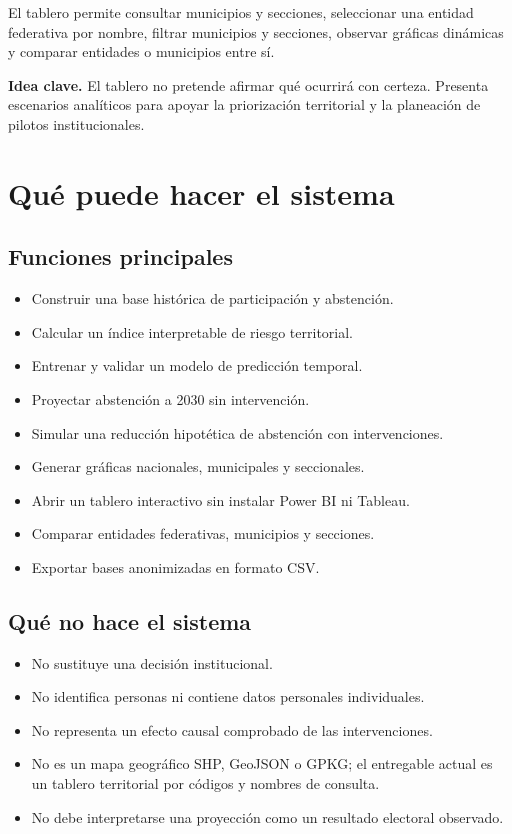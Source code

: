 \documentclass[11pt,a4paper]{article}
\begin{document}
El tablero permite consultar municipios y secciones, seleccionar una entidad federativa por nombre, filtrar municipios y secciones, observar gráficas dinámicas y comparar entidades o municipios entre sí.

\begin{resultado}
\textbf{Idea clave.} El tablero no pretende afirmar qué ocurrirá con certeza. Presenta escenarios analíticos para apoyar la priorización territorial y la planeación de pilotos institucionales.
\end{resultado}

\section{Qué puede hacer el sistema}

\subsection{Funciones principales}

\begin{itemize}
    \item Construir una base histórica de participación y abstención.
    \item Calcular un índice interpretable de riesgo territorial.
    \item Entrenar y validar un modelo de predicción temporal.
    \item Proyectar abstención a 2030 sin intervención.
    \item Simular una reducción hipotética de abstención con intervenciones.
    \item Generar gráficas nacionales, municipales y seccionales.
    \item Abrir un tablero interactivo sin instalar Power BI ni Tableau.
    \item Comparar entidades federativas, municipios y secciones.
    \item Exportar bases anonimizadas en formato CSV.
\end{itemize}

\subsection{Qué no hace el sistema}

\begin{itemize}
    \item No sustituye una decisión institucional.
    \item No identifica personas ni contiene datos personales individuales.
    \item No representa un efecto causal comprobado de las intervenciones.
    \item No es un mapa geográfico SHP, GeoJSON o GPKG; el entregable actual es un tablero territorial por códigos y nombres de consulta.
    \item No debe interpretarse una proyección como un resultado electoral observado.
\end{itemize}
\end{document}
